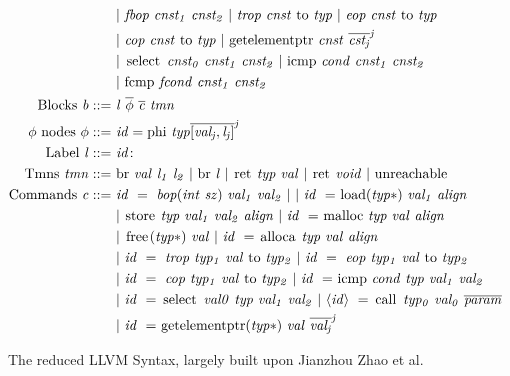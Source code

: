 \begin{figure}[!htb]
\begin{align*}
\begin{aligned}
&\mathit{|\ fbop\ cnst_{1}\ cnst_{2}\ |\ trop\ cnst\ }\kw{to}\mathit{\ typ\ |\ eop\ cnst\ }\kw{to}\mathit{\ typ}\\
&\mathit{|\ cop\ cnst\ }\kw{to}\mathit{\ typ\ |\ }\kw{getelementptr}\mathit{\ cnst\ \overline{cst_{j}}^{j}}\\
&\mathit{|\ }\kw{select}\mathit{\ cnst_{0}\ cnst_{1}\ cnst_{2}\ |\ }\kw{icmp}\mathit{\ cond\ cnst_{1}\ cnst_{2}}\\
&\mathit{|\ }\kw{fcmp}\mathit{\ fcond\ cnst_{1}\ cnst_{2}}\\
%
%
\text{Blocks } \mathit{b} ::=\ &\mathit{l\ \overline{\phi}\ \overline{c}\ tmn} \\
\phi\ \text{nodes } \phi ::=\ &\mathit{id} = \kw{phi}\ \mathit{typ \overline{[val_{j} , l_{j} ]}^{j}}\\
\text{Label } \mathit{l} ::=\ & \mathit{id}\kw{:}\\
\text{Tmns } \mathit{tmn} ::=\ &\kw{br}\mathit{\ val\ l_{1}\ l_{2} \ |\ }\kw{br}\mathit{\ l \ |\ }\kw{ret}\mathit{\ typ\ val\ |\ }\kw{ret}\mathit{\ void\ |\ }\kw{unreachable} \\
\text{Commands } \mathit{c} ::=\ &\mathit{id\ =\ bop(int\ sz)\ val_{1}\ val_{2}\ |\ }
\mathit{|\ id\ =\ }\kw{load}\mathit{(typ*)\ val_{1}\ align}\\
&\mathit{|\ }\kw{store}\mathit{\ typ\ val_{1}\ val_{2}\ align\ |\ id\ =\ }\kw{malloc}
\mathit{\ typ\ val\ align}\\
&\mathit{|\ }\kw{free}\mathit{(typ * )\ val\ |\ id\ =\ }\kw{alloca}\mathit{\ typ\ val\ align}\\
&\mathit{|\ id\ =\ trop\ typ_{1}\ val\ }\kw{to}\mathit{\ typ_{2}\ |\ id\ =\ eop\ typ_{1}\ val\ }\kw{to}\mathit{\ typ_{2}}\\
&\mathit{|\ id\ =\ cop\ typ_{1}\ val\ }\kw{to}\mathit{\ typ_{2}}
\mathit{\ |\ id\ =\ } \kw{icmp}\mathit{\ cond\ typ\ val_{1}\ val_{2}}\\
&|\ \mathit{id\ =\ }\kw{select}\mathit{\ val0\ typ\ val_{1}\ val_{2}\ }
\mathit{|\ \langle id\rangle\ =\ }\kw{call}\mathit{\ typ_{0}\ val_{0}\ \overline{param}}\\
&\mathit{|\ id\ =\ }\kw{getelementptr}\mathit{(typ*)\ val\ \overline{val_{j}}^{j}}
\end{aligned}
\end{align*}
\caption[Syntax: LLVM]{The reduced LLVM Syntax, largely built upon Jianzhou Zhao et al.~\cite{Zhao:2012:FLI:2103656.2103709} \label{fig:LLVMSyntax}}
\end{figure}

